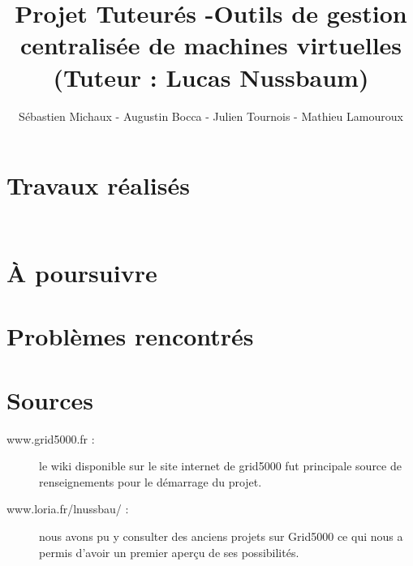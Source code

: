 \documentclass{report}
\begin{document}
\title{Projet Tuteurés -Outils de gestion centralisée de machines virtuelles (Tuteur : Lucas Nussbaum) }
\pagestyle
\author{Sébastien Michaux - Augustin Bocca - Julien Tournois - Mathieu Lamouroux}
\date{}
\maketitle
\chapter{Travaux réalisés}
\section{}

\begin{verbatim}

\end{verbatim}

\section{}
\subsection{}

\chapter{À poursuivre}

\chapter{Problèmes rencontrés}

\appendix
\chapter{Sources}
\begin{description}
\item[www.grid5000.fr : ]le wiki disponible sur le site internet de grid5000 fut principale source de renseignements pour le démarrage du projet.
\item[www.loria.fr/lnussbau/ : ]nous avons pu y consulter des anciens projets sur Grid5000 ce qui nous a permis d'avoir un premier aperçu de ses possibilités.
\end{description}
\end{document}
